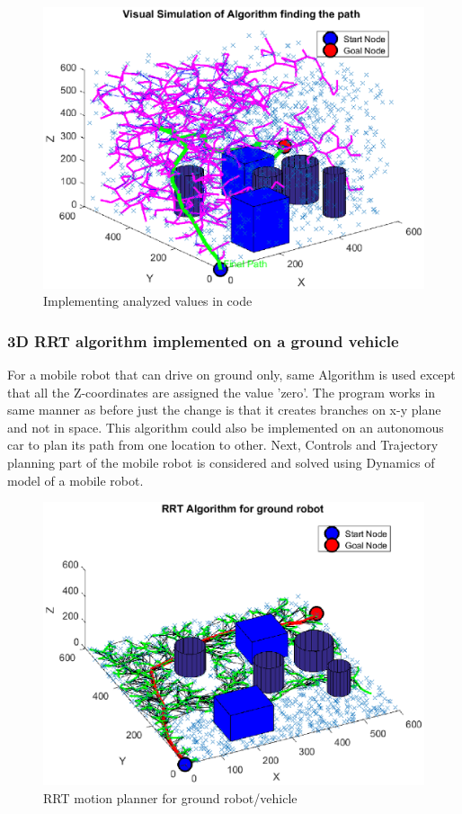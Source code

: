 \documentclass[12pt]{article}
\begin{document}
\begin{figure}[H]
    \centering
    \includegraphics[scale=0.5]{RRT_RUN3.eps}
    \captionsetup{labelformat=empty}
    \caption{Implementing analyzed values in code}
\end{figure}

\subsubsection{3D RRT algorithm implemented on a ground vehicle }
For a mobile robot that can drive on ground only, same Algorithm is used except that all the Z-coordinates are assigned the value 'zero'. The program works in same manner as before just the change is that it creates branches on x-y plane and not in space. This algorithm could also be implemented on  an autonomous car to plan its path from one location to other. Next, Controls and Trajectory planning part of the mobile robot is considered and solved using Dynamics of model of a mobile robot.
\begin{figure}[H]
    \centering
    \includegraphics[scale=0.35]{RRT_GROUND_RUN.eps}
    \captionsetup{labelformat=empty}
    \caption{RRT motion planner for ground robot/vehicle}
\end{figure}
\end{document}
